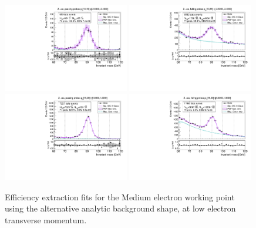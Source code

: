 \begin{figure}
\centering
\includegraphics[width=0.49\textwidth]{figures/Zee_RecoTemplate_BkgAnalytic_pass_ptBin0_etaBin0.pdf}
\includegraphics[width=0.49\textwidth]{figures/Zee_RecoTemplate_BkgAnalytic_fail_ptBin0_etaBin0.pdf}
\includegraphics[width=0.49\textwidth]{figures/Zee_RecoTemplate_BkgAnalytic_pass_ptBin1_etaBin19.pdf}
\includegraphics[width=0.49\textwidth]{figures/Zee_RecoTemplate_BkgAnalytic_fail_ptBin1_etaBin19.pdf}
\caption{Efficiency extraction fits for the Medium electron working point using the alternative analytic background shape, at low electron transverse momentum.}
\label{fig:ZeeAltBkgFits1}
\end{figure}

